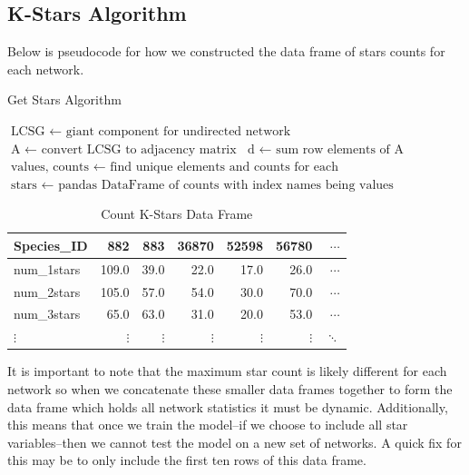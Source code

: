 \documentclass[12pt]{article}
\begin{document}
\subsection{K-Stars Algorithm}
Below is pseudocode for how we constructed the data frame of stars counts for each network.
\begin{algorithm}
\caption{Get Stars Algorithm}\label{alg:cap}
\begin{algorithmic}
\State $\text{LCSG } \gets \text{ giant component for undirected network}$
\State $\text{A } \gets \text{ convert LCSG to adjacency matrix}$
\State $\text{d } \gets \text{ sum row elements of A}$
\State $\text{values, counts } \gets \text{ find unique elements and counts for each}$
\State $\text{stars } \gets \text{ pandas DataFrame of counts with index names being values}$
\end{algorithmic}
\end{algorithm}
\begin{table}[H]
\centering
\caption{Count K-Stars Data Frame}
\begin{tabular}{lrrrrrr}
\toprule
Species\_ID &  882   &  883   &  36870 &  52598 &  56780 & $\cdots$\\
\midrule
num\_1stars &  109.0 &   39.0 &   22.0 &   17.0 &   26.0 & $\cdots$\\
num\_2stars &  105.0 &   57.0 &   54.0 &   30.0 &   70.0 & $\cdots$\\
num\_3stars &   65.0 &   63.0 &   31.0 &   20.0 &   53.0 & $\cdots$\\
$\vdots$ &   $\vdots$ &   $\vdots$ &   $\vdots$ &    $\vdots$ &   $\vdots$ & $\ddots$\\
\bottomrule
\end{tabular}
\end{table}
It is important to note that the maximum star count is likely different for each network so when we concatenate these smaller data frames together to form the data frame which holds all network statistics it must be dynamic. Additionally, this means that once we train the model--if we choose to include all star variables--then we cannot test the model on a new set of networks. A quick fix for this may be to only include the first ten rows of this data frame.
\end{document}
